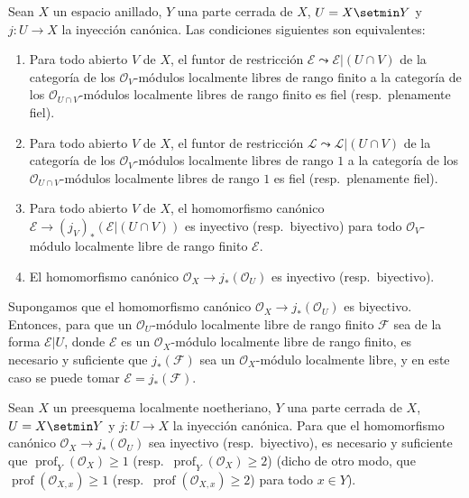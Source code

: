 \begin{corollary}[21.13.3]
\label{IV.21.13.3}
Sean $X$ un espacio anillado, $Y$ una parte cerrada de $X$, $U=X\setmin Y$ y
$j:U\to X$ la inyección canónica. Las condiciones siguientes son equivalentes:
\begin{enumerate}[label=\emph{\alph*)}]
  \item Para todo abierto $V$ de $X$, el funtor de restricción
  $\mathscr E\leadsto\mathscr E|(U\cap V)$ de la categoría de los
  $\mathcal O_V$-módulos localmente libres de rango finito a la categoría de los
  $\mathcal O_{U\cap V}$-módulos localmente libres de rango finito es fiel
  \textup{(resp.}\ plenamente fiel\textup{)}.
  \item[\emph{a')}] Para todo abierto $V$ de $X$, el funtor de restricción
  $\mathscr L\leadsto\mathscr L|(U\cap V)$ de la categoría de los
  $\mathcal O_V$-módulos localmente libres de rango $1$ a la categoría de los
  $\mathcal O_{U\cap V}$-módulos localmente libres de rango $1$ es fiel
  \textup{(resp.}\ plenamente fiel\textup{)}.
  \item Para todo abierto $V$ de $X$, el homomorfismo canónico
  $\mathscr E\to(j_V)_*(\mathscr E|(U\cap V))$ es inyectivo \textup{(resp.}\ biyectivo\textup{)} para
  todo $\mathcal O_V$-módulo localmente libre de rango finito $\mathscr E$.
  \item[\emph{b')}] El homomorfismo canónico
  $\mathcal O_X\to j_*(\mathcal O_U)$ es inyectivo \textup{(resp.}\ biyectivo\textup{)}.
\end{enumerate}

Supongamos que el homomorfismo canónico $\mathcal O_X\to j_*(\mathcal O_U)$ es
biyectivo. Entonces, para que un $\mathcal O_U$-módulo localmente libre de rango finito
$\mathscr F$ sea de la forma $\mathscr E|U$, donde $\mathscr E$ es un
$\mathcal O_X$-módulo localmente libre de rango finito, es necesario y suficiente que
$j_*(\mathscr F)$ sea un $\mathcal O_X$-módulo localmente libre, y en este caso se
puede tomar $\mathscr E=j_*(\mathscr F)$.
\end{corollary}

\begin{lemma}[21.13.4]
\label{IV.21.13.4}
Sean $X$ un preesquema localmente noetheriano, $Y$ una parte cerrada de $X$,
$U=X\setmin Y$ y $j:U\to X$ la inyección canónica. Para que el homomorfismo canónico
$\mathcal O_X\to j_*(\mathcal O_U)$ sea inyectivo \textup{(resp.}\ biyectivo\textup{)}, es necesario y
suficiente que $\operatorname{prof}_Y(\mathcal O_X)\geq1$
\textup{(resp.\ $\operatorname{prof}_Y(\mathcal O_X)\geq2$) (dicho de otro modo, que
$\operatorname{prof}(\mathcal O_{X,x})\geq1$
(resp.\ $\operatorname{prof}(\mathcal O_{X,x})\geq2$) para todo $x\in Y$)}.
\end{lemma}

